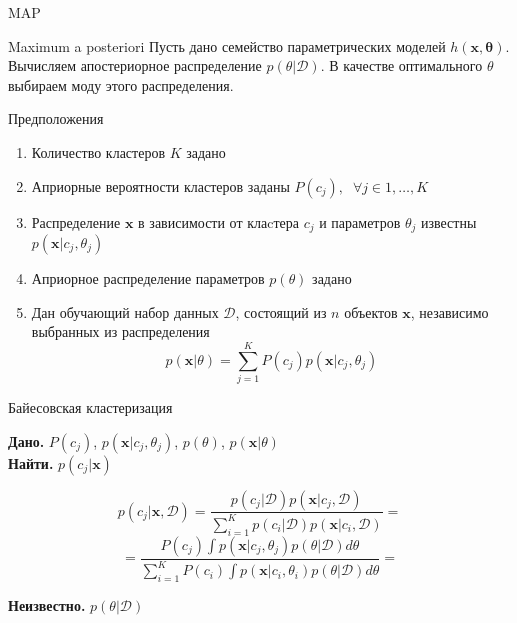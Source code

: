 \documentclass[10pt]{beamer}
\begin{document}
\begin{frame}{MAP}

\begin{block}{Maximum a posteriori}
Пусть дано семейство параметрических моделей $h(\mathbf{x}, \mathbf{\theta})$. Вычисляем апостериорное распределение $p(\theta | \mathcal{D})$. В качестве оптимального $\theta$ выбираем моду этого распределения.
\end{block}

\vspace{1em}
Предположения
\begin{enumerate}
\item Количество кластеров $K$ задано
\item Априорные вероятности кластеров заданы $P(c_j), \;\; \forall j \in 1,\ldots,K$
\item Распределение $\mathbf{x}$ в зависимости от клаcтера $c_j$ и параметров $\theta_j$ известны $p(\mathbf{x} | c_j, \theta_j)$
\item Априорное распределение параметров $p(\theta)$ задано
\item Дан обучающий набор данных $\mathcal{D}$, состоящий из $n$ объектов $\mathbf{x}$, независимо выбранных из распределения
\[
p(\mathbf{x} | \theta) = \sum_{j=1}^K P(c_j) p(\mathbf{x} | c_j, \theta_j)
\]
\end{enumerate}

\end{frame}

\begin{frame}{Байесовская кластеризация}

{\bf Дано.} \underline{$P(c_j)$}, \underline{$p(\mathbf{x} | c_j, \theta_j)$}, $p(\theta)$, $p(\mathbf{x} | \theta)$ \\
{\bf Найти.} $p(c_j | \mathbf{x})$

\[
p(c_j | \mathbf{x}, \mathcal{D}) = \frac{p(c_j | \mathcal{D}) p(\mathbf{x} | c_j, \mathcal{D})}{\sum_{i=1}^K p(c_i | \mathcal{D}) p(\mathbf{x} | c_i, \mathcal{D})} =
\]
\[
= \frac{P(c_j) \int p(\mathbf{x} | c_j, \theta_j) p(\theta | \mathcal{D}) d \theta}{\sum_{i=1}^K P(c_i) \int p(\mathbf{x} | c_i, \theta_i) p(\theta | \mathcal{D}) d \theta} =
\]

{\bf Неизвестно.} $p(\theta | \mathcal{D})$

\end{frame}
\end{document}
